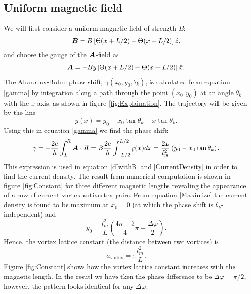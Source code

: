 \subsection{Uniform magnetic field}
\label{sec:ConstField}
We will first consider a uniform magnetic field of strength $B$:
\begin{equation}
    \boldsymbol{B} = B\left[\Theta(x+L/2) - \Theta(x-L/2) \right]\hat{z},
\end{equation}
and choose the gauge of the $\boldsymbol{A}$-field as
\begin{equation}
    \boldsymbol{A} = -By\left[\Theta(x+L/2) - \Theta(x-L/2) \right]\hat{x}.
\end{equation}
The Aharonov-Bohm phase shift, $\gamma(x_0,y_0,\theta_k)$, is calculated from equation \eqref{gamma} by integration along a path through the point $(x_0,y_0)$ at an angle $\theta_k$ with the $x$-axis, as shown in figure \ref{fig:Explaination}. The trajectory will be given by the line
\begin{equation}
    y(x) = y_0-x_0\tan\theta_k + x\tan\theta_k.
    \label{trajectory}
\end{equation}
Using this in equation \eqref{gamma} we find the phase shift:
\begin{equation}
    \gamma = -\frac{2e}{\hbar}\int_L^R \boldsymbol{A}\cdot d\boldsymbol{l} = B\frac{2e}{\hbar}\int_{-L/2}^{L/2}y(x)dx = \frac{2L}{l_m^2}\left(y_0 - x_0\tan\theta_k \right).
\label{gamma1}
\end{equation}
This expression is used in equation \eqref{dIwithB} and \eqref{CurrentDensity} in order to find the current density. The result from numerical computation is shown in figure \ref{fig:Constant} for three different magnetic lengths revealing the appearance of a row of current vortex-antivortex pairs. From equation \eqref{Maximize} the current density is found to be maximum at $x_0=0$ (at which the phase shift is $\theta_k$-independent) and
\begin{equation}
    y_0 = \frac{l_m^2}{L}\left(\frac{4n-3}{4}\pi + \frac{\Delta \varphi}{2}\right).
\end{equation}
Hence, the vortex lattice constant (the distance between two vortices) is
\begin{equation}
    a_{\mathrm{vortex}} = \pi\frac{l_m^2}{L}.
\end{equation}
Figure \ref{fig:Constant} shows how the vortex lattice constant increases with the magnetic length. In the resutl we have tken the phase difference to be $\Delta \varphi = \pi/2$, however, the pattern looks identical for any $\Delta \varphi$.
